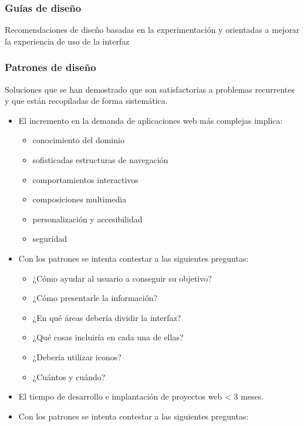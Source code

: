 \documentclass[12pt, twoside, openright]{report} %
\begin{document}
\subsubsection{Guías de diseño}
      Recomendaciones de diseño basadas en la
      experimentación y orientadas a mejorar la experiencia de uso de la
      interfaz

\subsubsection{Patrones de diseño}
      Soluciones que se han demostrado que son
      satisfactorias a problemas recurrentes y que están recopiladas de
      forma sistemática.

      \begin{itemize}
      
      \item
        El incremento en la demanda de aplicaciones web más complejas
        implica:
        \vspace{-0.5cm}

        \begin{itemize}
        
        \item
          conocimiento del dominio
        \item
          sofisticadas estructuras de navegación
        \item
          comportamientos interactivos
        \item
          composiciones multimedia
        \item
          personalización y accesibilidad
        \item
          seguridad
        \end{itemize}
      \item
        Con los patrones se intenta contestar a las siguientes
        preguntas:
\vspace{-0.5cm}
        \begin{itemize}
        
        \item
          ¿Cómo ayudar al usuario a conseguir su objetivo?
        \item
          ¿Cómo presentarle la información?
        \item
          ¿En qué áreas debería dividir la interfaz?
        \item
          ¿Qué cosas incluiría en cada una de ellas?
        \item
          ¿Debería utilizar iconos?
        \item
          ¿Cuántos y cuándo?
        \end{itemize}
      \item
        El tiempo de desarrollo e implantación de proyectos web
        \textless{} 3 meses.
      \item
        Con los patrones se intenta contestar a las siguientes
        preguntas:
        \vspace{-0.5cm}


\end{itemize}
\end{document}
